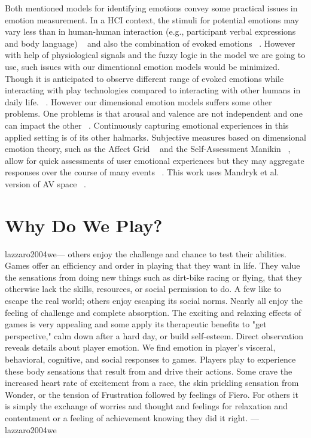 Both mentioned models for identifying emotions convey some
practical issues in emotion measurement. In a HCI context, the 
stimuli for potential emotions may vary less than
in human-human interaction (e.g., participant verbal expressions and body language) 
~\cite{zhang2010service} and also the combination of
evoked emotions ~\cite{peter2006emotion}. However with help of physiological
signals and the fuzzy logic in the model we are going to
use, such issues with our dimentional emotion models would
be minimized. Though it is anticipated to observe different range 
of evoked emotions while interacting with play
technologies compared to interacting with other humans in
daily life. ~\cite{zhang2010service}. However our dimensional emotion models
suffers some other problems. One problems is that arousal
and valence are not independent and one can impact the
other ~\cite{mandryk2007fuzzy}. Continuously capturing emotional experiences
in this applied setting is of its other halmarks. Subjective
measures based on dimensional emotion theory, such as the
Affect Grid ~\cite{russell1989affect} and the Self-Assessment 
Manikin ~\cite{bradley1994measuring}, allow
for quick assessments of user emotional experiences but they
may aggregate responses over the course of many events ~\cite{zhang2010service}.
This work uses Mandryk et al. version of AV space ~\cite{mandryk2007fuzzy}.


\section{Why Do We Play?}

lazzaro2004we---
others enjoy the challenge and chance to test their abilities. Games offer an efficiency 
and order in playing that they want in life. They value the sensations from doing new 
things such as dirt-bike racing or flying, that they otherwise lack the skills, 
resources, or social permission to do. A few like to escape the real world; others 
enjoy escaping its social norms. Nearly all enjoy the feeling of challenge and complete 
absorption. The exciting and relaxing effects of games is very appealing and some apply 
its therapeutic benefits to "get perspective," calm down after a hard day, or build 
self-esteem. Direct observation reveals details about player emotion. We find emotion 
in player's visceral, behavioral, cognitive, and social responses to games. Players play 
to experience these body sensations that result from and drive their actions. Some crave 
the increased heart rate of excitement from a race, the skin prickling sensation from 
Wonder, or the tension of Frustration followed by feelings of Fiero. For others it is 
simply the exchange of worries and thought and feelings for relaxation and contentment 
or a feeling of achievement knowing they did it right. ---lazzaro2004we

